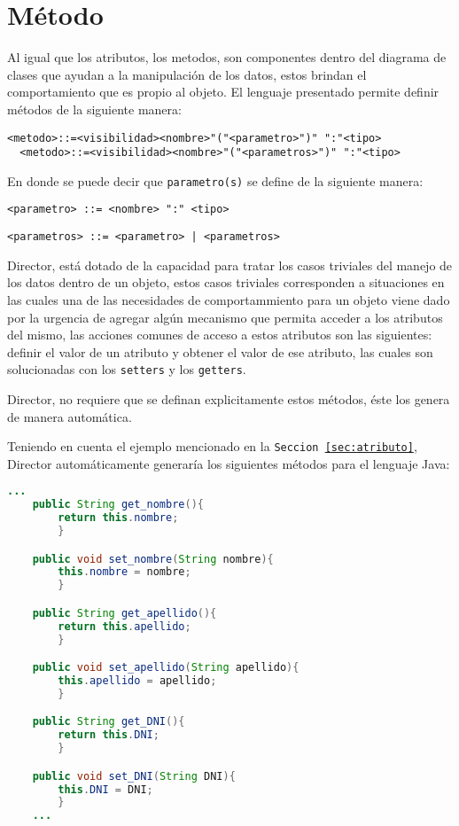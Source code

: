 \section{Método}
\label{sec:metodo}
Al igual que los atributos, los metodos, son componentes dentro del diagrama de
clases que ayudan a la manipulación de los datos, estos brindan el
comportamiento que es propio al objeto. El lenguaje presentado permite definir
métodos de la siguiente manera:

\begin{lstlisting}[caption={BNF - Método}, basicstyle=\footnotesize\ttfamily]
  <metodo>::=<visibilidad><nombre>"("<parametro>")" ":"<tipo>
  <metodo>::=<visibilidad><nombre>"("<parametros>")" ":"<tipo>
\end{lstlisting}

En donde se puede decir que \texttt{parametro(s)} se define de la siguiente
manera:

\begin{lstlisting}[basicstyle=\footnotesize\ttfamily]
  <parametro> ::= <nombre> ":" <tipo>
\end{lstlisting}

\begin{lstlisting}[basicstyle=\footnotesize\ttfamily]
  <parametros> ::= <parametro> | <parametros>
\end{lstlisting}

Director, está dotado de la capacidad para tratar los casos triviales del
manejo de los datos dentro de un objeto, estos casos triviales corresponden a
situaciones en las cuales una de las necesidades de comportammiento para un
objeto viene dado por la urgencia de agregar algún mecanismo que permita
acceder a los atributos del mismo, las acciones comunes de acceso a estos
atributos son las siguientes: definir el valor de un atributo y obtener el
valor de ese atributo, las cuales son solucionadas con los \texttt{setters}
y los \texttt{getters}.

Director, no requiere que se definan explicitamente estos métodos, éste los
genera de manera automática.

Teniendo en cuenta el ejemplo mencionado en la \texttt{Seccion
\ref{sec:atributo}}, Director automáticamente generaría los siguientes métodos
para el lenguaje Java:

\begin{lstlisting}[language=Java, basicstyle=\footnotesize\ttfamily,
label=lst:drt_java_metodo, caption={Java - Generación \texttt{Fragmento \ref{sec:atributo}}}]
  ...
	public String get_nombre(){
		return this.nombre;
		}

	public void set_nombre(String nombre){
		this.nombre = nombre;
		}

	public String get_apellido(){
		return this.apellido;
		}

	public void set_apellido(String apellido){
		this.apellido = apellido;
		}

	public String get_DNI(){
		return this.DNI;
		}

	public void set_DNI(String DNI){
		this.DNI = DNI;
		}
	...
\end{lstlisting}

